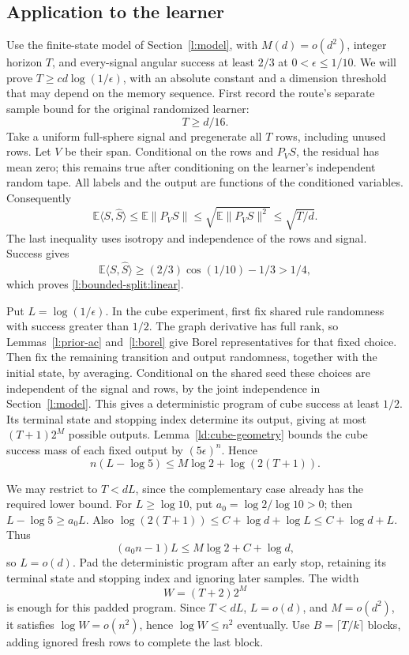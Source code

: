 \subsection{Application to the learner}

Use the finite-state model of Section~\ref{l:model}, with
\(M(d)=o(d^2)\), integer horizon \(T\), and every-signal angular
success at least \(2/3\) at \(0<\epsilon\le1/10\).
We will prove \(T\ge c d\log(1/\epsilon)\), with an absolute
constant and a dimension threshold that may depend on the memory
sequence.  First record the route's separate sample bound for the
original randomized learner:
\begin{equation}\label{l:bounded-split:linear}
 T\ge d/16.
\end{equation}
Take a uniform full-sphere signal and pregenerate all \(T\) rows,
including unused rows.  Let \(V\) be their span.  Conditional on
the rows and \(P_VS\), the residual has mean zero; this remains true
after conditioning on the learner's independent random tape.
All labels and the output are functions of the conditioned variables.
Consequently
\[
 \mathbb E\langle S,\widehat S\rangle
 \le\mathbb E\|P_VS\|
 \le\sqrt{\mathbb E\|P_VS\|^2}
 \le\sqrt{T/d}.
\]
The last inequality uses isotropy and independence of the rows and
signal.  Success gives
\[
 \mathbb E\langle S,\widehat S\rangle
 \ge(2/3)\cos(1/10)-1/3>1/4,
\]
which proves \eqref{l:bounded-split:linear}.

Put \(L=\log(1/\epsilon)\).  In the cube experiment, first fix
shared rule randomness with success greater than \(1/2\).
The graph derivative has full rank, so Lemmas~\ref{l:prior-ac}
and~\ref{l:borel} give Borel representatives for that fixed choice.
Then fix the remaining transition and output randomness, together with
the initial state, by averaging.  Conditional on the shared seed these
choices are independent of the signal and rows, by the joint
independence in Section~\ref{l:model}.  This gives a deterministic
program of cube success at least \(1/2\).  Its terminal state and
stopping index determine its output, giving at most \((T+1)2^M\)
possible outputs.  Lemma~\ref{ld:cube-geometry} bounds the cube success
mass of each fixed output by \((5\epsilon)^n\).  Hence
\begin{equation}\label{l:bounded-split:output-count}
 n(L-\log5)\le M\log2+\log(2(T+1)).
\end{equation}

We may restrict to \(T<dL\), since the complementary case already
has the required lower bound.  For \(L\ge\log10\), put
\(a_0=\log2/\log10>0\); then \(L-\log5\ge a_0L\).
Also \(\log(2(T+1))\le C+\log d+\log L\le C+\log d+L\).
Thus
\[
 (a_0n-1)L\le M\log2+C+\log d,
\]
so \(L=o(d)\).  Pad the deterministic program after an early stop,
retaining its terminal state and stopping index and ignoring later
samples.  The width
\begin{equation}\label{l:bounded-split:width}
 W=(T+2)2^M
\end{equation}
is enough for this padded program.  Since \(T<dL\), \(L=o(d)\),
and \(M=o(d^2)\), it satisfies \(\log W=o(n^2)\), hence
\(\log W\le n^2\) eventually.  Use \(B=\lceil T/k\rceil\)
blocks, adding ignored fresh rows to complete the last block.

